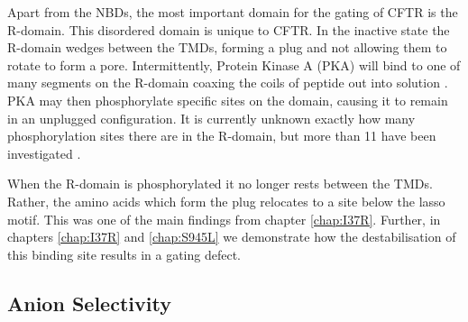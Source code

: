 Apart from the NBDs, the most important domain for the gating of CFTR is the R-domain. This disordered domain is unique to CFTR. In the inactive state the R-domain wedges between the TMDs, forming a plug and not allowing them to rotate to form a pore. Intermittently, Protein Kinase A (PKA) will bind to one of many segments on the R-domain coaxing the coils of peptide out into solution \cite{mihalyi2020}. PKA may then phosphorylate specific sites on the domain, causing it to remain in an unplugged configuration. It is currently unknown exactly how many phosphorylation sites there are in the R-domain, but more than 11 have been investigated \cite{mihalyi2020}. 

When the R-domain is phosphorylated it no longer rests between the TMDs. Rather, the amino acids which form the plug relocates to a site below the lasso motif. This was one of the main findings from chapter \ref{chap:I37R}. Further, in chapters \ref{chap:I37R} and \ref{chap:S945L} we demonstrate how the destabilisation of this binding site results in a gating defect.  



\subsection {Anion Selectivity}

